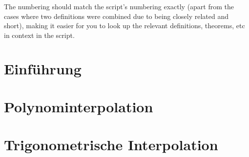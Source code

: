 \documentclass{article}
\begin{document}
The numbering should match the script's numbering exactly (apart from the cases where two definitions were combined due to being closely related and short), making it easier for you to look up the relevant definitions, theorems, etc in context in the script.




\newsection
\section{Einführung}




\newsection
\section{Polynominterpolation}






\newsection
\section{Trigonometrische Interpolation}


\end{document}
